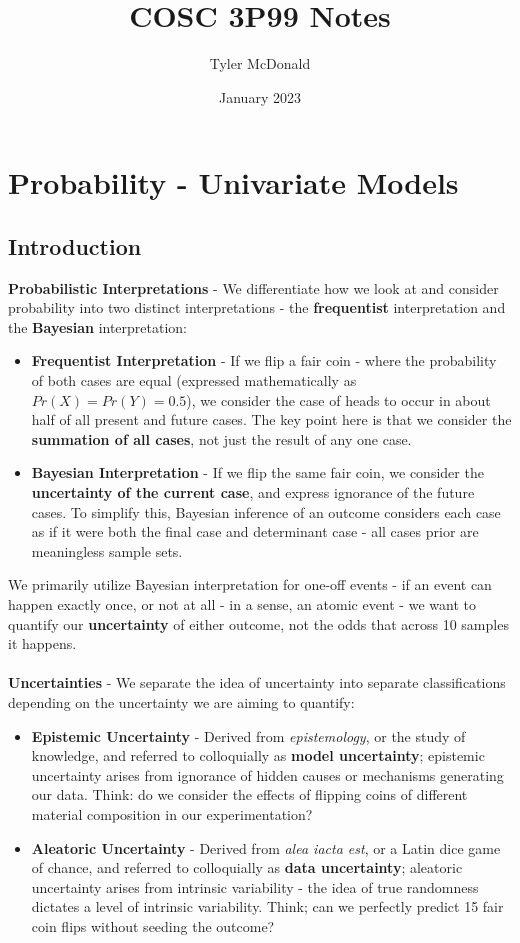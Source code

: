 \documentclass{article}
\title{COSC 3P99 Notes}
\author{Tyler McDonald}
\date{January 2023}
\begin{document}
\maketitle

\section{Probability - Univariate Models}
\subsection{Introduction}
\textbf{Probabilistic Interpretations} - We differentiate how we look at and consider probability into two distinct interpretations - the \textbf{frequentist} interpretation and the \textbf{Bayesian} interpretation:
\begin{itemize}
\item \textbf{Frequentist Interpretation} - If we flip a fair coin - where the probability of both cases are equal (expressed mathematically as $Pr(X) = Pr(Y) = 0.5$), we consider the case of heads to occur in about half of all present and future cases. The key point here is that we consider the \textbf{summation of all cases}, not just the result of any one case.
\item \textbf{Bayesian Interpretation} - If we flip the same fair coin, we consider the \textbf{uncertainty of the current case}, and express ignorance of the future cases. To simplify this, Bayesian inference of an outcome considers each case as if it were both the final case and determinant case - all cases prior are meaningless sample sets.\\
\end{itemize}
We primarily utilize Bayesian interpretation for one-off events - if an event can happen exactly once, or not at all - in a sense, an atomic event - we want to quantify our \textbf{uncertainty} of either outcome, not the odds that across 10 samples it happens.\\
\\
\textbf{Uncertainties} - We separate the idea of uncertainty into separate classifications depending on the uncertainty we are aiming to quantify:
\begin{itemize}
\item \textbf{Epistemic Uncertainty} - Derived from \textit{epistemology}, or the study of knowledge, and referred to colloquially as \textbf{model uncertainty}; epistemic uncertainty arises from ignorance of hidden causes or mechanisms generating our data. Think: do we consider the effects of flipping coins of different material composition in our experimentation?
\item \textbf{Aleatoric Uncertainty} - Derived from \textit{alea iacta est}, or a Latin dice game of chance, and referred to colloquially as \textbf{data uncertainty}; aleatoric uncertainty arises from intrinsic variability - the idea of true randomness dictates a level of intrinsic variability. Think; can we perfectly predict 15 fair coin flips without seeding the outcome?
\end{itemize}
\end{document}

